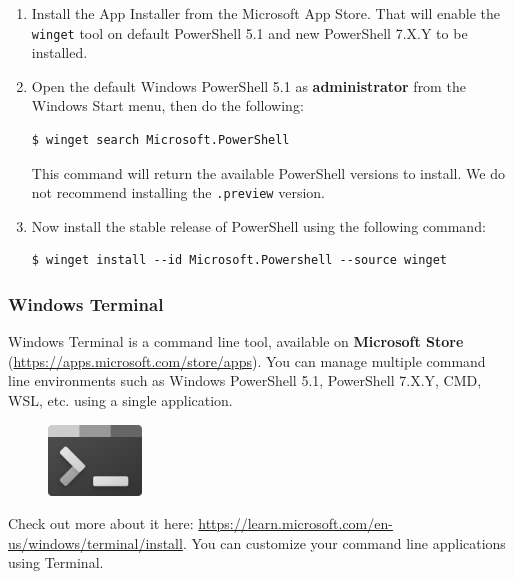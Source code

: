 \documentclass[12pt]{article}
\begin{document}
\begin{enumerate}[label={\arabic*.}, leftmargin= 0.6 cm,itemsep = 0.25cm,topsep= .25cm]

\item Install the App Installer from the Microsoft App Store. That will enable the \texttt{winget} tool on default PowerShell 5.1 and new PowerShell 7.X.Y to be installed.

\item Open the default Windows PowerShell 5.1 as \textbf{administrator} from the Windows Start menu, then do the following:

\begin{lstlisting}[style=terminal]
$ winget search Microsoft.PowerShell
\end{lstlisting}

This command will return the available PowerShell versions to install. We do not recommend installing the \texttt{.preview} version. 

\item Now install the stable release of PowerShell using the following command:

\begin{lstlisting}[style=terminal]
$ winget install --id Microsoft.Powershell --source winget
\end{lstlisting}

\end{enumerate}

\subsubsection*{Windows Terminal} 

Windows Terminal is a command line tool, available on \textbf{Microsoft Store} (\url{https://apps.microsoft.com/store/apps}). You can manage multiple command line environments such as Windows PowerShell 5.1, PowerShell 7.X.Y, CMD, WSL, etc. using a single application.

\begin{figure}[H]
    \centering
    \includegraphics[width=2.5cm,trim={0 1cm 0 1.5cm},clip]{terminal-logo.png}
\end{figure}

Check out more about it here: \url{https://learn.microsoft.com/en-us/windows/terminal/install}. You can customize your command line applications using Terminal.
\end{document}

